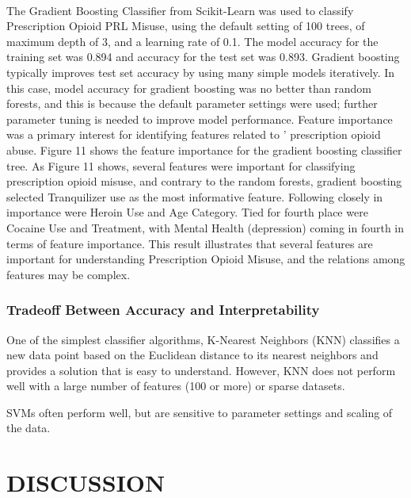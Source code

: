 \\\documentclass[sigconf]{acmart}
\begin{document}
The Gradient Boosting Classifier from Scikit-Learn was used to classify 
Prescription Opioid PRL Misuse, using the default setting of 100 trees, of 
maximum depth of 3, and a learning rate of 0.1. The model accuracy for the
training set was 0.894 and accuracy for the test set was 0.893. Gradient 
boosting typically improves test set accuracy by using many simple models 
iteratively. In this case, model accuracy for gradient boosting was no better 
than random forests, and this is because the default parameter settings were
used; further parameter tuning is needed to improve model performance. Feature 
importance was a primary interest for identifying features related to '
prescription opioid abuse. Figure 11 shows the feature importance for the 
gradient boosting classifier tree. As Figure 11 shows, several features were 
important for classifying prescription opioid misuse, and contrary to the 
random forests, gradient boosting selected Tranquilizer use as the most 
informative feature. Following closely in importance were Heroin Use and Age 
Category. Tied for fourth place were Cocaine Use and Treatment, with Mental 
Health (depression) coming in fourth in terms of feature importance. This 
result illustrates that several features are important for understanding 
Prescription Opioid Misuse, and the relations among features may be complex.


\subsubsection{Tradeoff Between Accuracy and Interpretability}

One of the simplest classifier algorithms, K-Nearest Neighbors (KNN)
classifies a new data point based on the Euclidean distance to its 
nearest neighbors and provides a solution that is easy to understand. 
However, KNN does not perform well with a large number of features 
(100 or more) or sparse datasets.

SVMs often perform well, but are sensitive to parameter settings 
and scaling of the data. 


\section{DISCUSSION}
\end{document}
